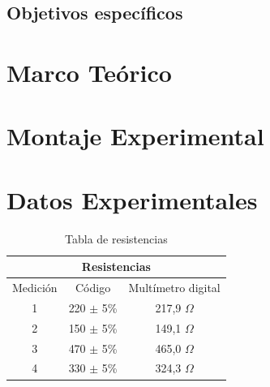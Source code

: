 \documentclass[letterpaper, 12pt]{report}
\begin{document}
\subsection{Objetivos específicos}

\newpage

\section{Marco Teórico}

\section{Montaje Experimental}

\section{Datos Experimentales}

\begin{table}[h]
	\begin{center}
		\begin{tabular}{|c|c|c|}
			\multicolumn{3}{c}{Resistencias}              \\ \hline
			Medición & Código        & Multímetro digital \\ \hline
			1        & 220 $\pm$ 5\% & 217,9 $\Omega$     \\ \hline
			2        & 150 $\pm$ 5\% & 149,1 $\Omega$     \\ \hline
			3        & 470 $\pm$ 5\% & 465,0 $\Omega$     \\ \hline
			4        & 330 $\pm$ 5\% & 324,3 $\Omega$     \\ \hline
		\end{tabular}
		\caption{Tabla de resistencias}
		\label{tab:resistencias}
	\end{center}
\end{table}

\end{document}

